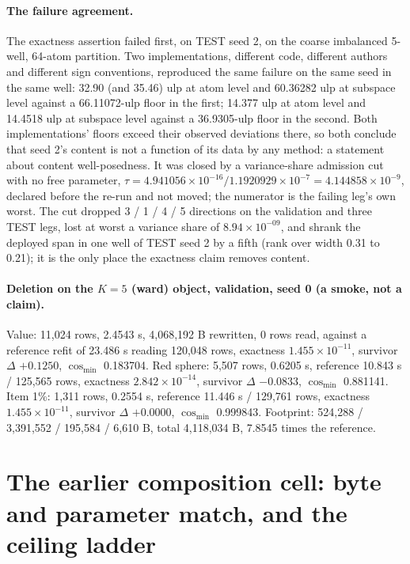 \documentclass{article} %
\newcommand{\sci}[2]{\ensuremath{#1\times10^{#2}}}
\begin{document}
\paragraph{The failure agreement.} The exactness assertion failed first, on TEST seed 2, on the
coarse imbalanced 5-well, 64-atom partition. Two implementations, different code, different
authors and different sign conventions, reproduced the same failure on the same seed in the same
well: 32.90 (and 35.46) ulp at atom level and 60.36282 ulp at subspace level against a 66.11072-ulp
floor in the first; 14.377 ulp at atom level and 14.4518 ulp at subspace level against a
36.9305-ulp floor in the second. Both implementations' floors exceed their observed deviations
there, so both conclude that seed 2's content is not a function of its data by any method: a
statement about content well-posedness. It was closed by a variance-share admission cut with no
free parameter, $\tau=4.941056\times10^{-16}/1.1920929\times10^{-7}=4.144858\times10^{-9}$, declared
before the re-run and not moved; the numerator is the failing leg's own worst.
The cut dropped 3 / 1 / 4 / 5 directions on the validation and three TEST legs, lost at worst a
variance share of \sci{8.94}{-09}, and shrank the deployed span in one well of TEST seed 2 by a fifth
(rank over width 0.31 to 0.21); it is the only place the exactness claim removes content.

\paragraph{Deletion on the $K=5$ (ward) object, validation, seed 0 (a smoke, not a claim).} Value:
11,024 rows, 2.4543 s, 4,068,192 B rewritten, 0 rows read, against a reference refit of 23.486 s
reading 120,048 rows, exactness \sci{1.455}{-11}, survivor $\Delta$ $+0.1250$, $\cos_{\min}$
0.183704. Red sphere: 5,507 rows, 0.6205 s, reference 10.843 s / 125,565 rows, exactness
\sci{2.842}{-14}, survivor $\Delta$ $-0.0833$, $\cos_{\min}$ 0.881141. Item 1\%: 1,311 rows,
0.2554 s, reference 11.446 s / 129,761 rows, exactness \sci{1.455}{-11}, survivor $\Delta$
$+0.0000$, $\cos_{\min}$ 0.999843. Footprint: 524,288 / 3,391,552 / 195,584 / 6,610 B, total
4,118,034 B, 7.8545 times the reference. %

\section{The earlier composition cell: byte and parameter match, and the ceiling ladder}
\label{app:w5}
\end{document}
